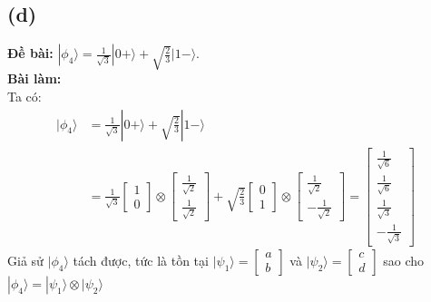 \subsection{(d)}
\textbf{Đề bài:} $|\phi_{4}\rangle=\frac{1}{\sqrt{3}}|0+\rangle+\sqrt{\frac{2}{3}}|1-\rangle$.\\
\textbf{Bài làm:}\\
Ta có:
\begin{align*}
    |\phi_{4}\rangle & =\frac{1}{\sqrt{3}}|0+\rangle+\sqrt{\frac{2}{3}}|1-\rangle                                                       \\
                     & = \frac{1}{\sqrt{3}} \begin{bmatrix}
                                                1 \\0
                                            \end{bmatrix} \otimes \begin{bmatrix}
                                                                      \frac{1}{\sqrt{2}} \\ \frac{1}{\sqrt{2}}
                                                                  \end{bmatrix}
    + \sqrt{\frac{2}{3}} \begin{bmatrix}
                             0 \\1
                         \end{bmatrix} \otimes \begin{bmatrix}
                                                   \frac{1}{\sqrt{2}} \\ -\frac{1}{\sqrt{2}}
                                               \end{bmatrix}
    = \begin{bmatrix}
          \frac{1}{\sqrt{6}} \\
          \frac{1}{\sqrt{6}} \\
          \frac{1}{\sqrt{3}} \\
          -\frac{1}{\sqrt{3}}
      \end{bmatrix}
\end{align*}
Giả sử $|\phi_{4}\rangle$ tách được, tức là tồn tại $|\psi_1\rangle=\begin{bmatrix}a\\b\end{bmatrix}$ và $|\psi_2\rangle=\begin{bmatrix}c\\d\end{bmatrix}$ sao cho $|\phi_{4}\rangle=|\psi_1\rangle \otimes |\psi_2\rangle$\\
